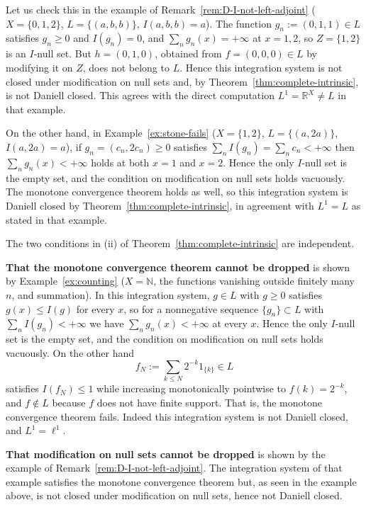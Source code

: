 \begin{example}
  Let us check this in the example of
  Remark~\ref{rem:D-I-not-left-adjoint} ($X=\{0,1,2\}$, $L=\{(a,b,b)\}$,
  $I(a,b,b)=a$).
  The function $g_n:=(0,1,1)\in L$ satisfies $g_n\ge0$ and $I(g_n)=0$, and
  $\sum_ng_n(x)=+\infty$ at $x=1,2$, so $Z=\{1,2\}$ is an $I$-null set.
  But $h=(0,1,0)$, obtained from $f=(0,0,0)\in L$ by modifying it on $Z$, does
  not belong to $L$.
  Hence this integration system is not closed under modification on null sets
  and, by Theorem~\ref{thm:complete-intrinsic}, is not Daniell closed.
  This agrees with the direct computation $L^1=\mathbb{R}^X\ne L$ in that
  example.

  On the other hand, in Example~\ref{ex:stone-fails} ($X=\{1,2\}$,
  $L=\{(a,2a)\}$, $I(a,2a)=a$), if $g_n=(c_n,2c_n)\ge0$ satisfies
  $\sum_nI(g_n)=\sum_nc_n<+\infty$ then $\sum_ng_n(x)<+\infty$ holds at both
  $x=1$ and $x=2$.
  Hence the only $I$-null set is the empty set, and the condition on
  modification on null sets holds vacuously.
  The monotone convergence theorem holds as well, so this integration system is
  Daniell closed by Theorem~\ref{thm:complete-intrinsic}, in agreement with
  $L^1=L$ as stated in that example.
\end{example}

\begin{remark}\label{rem:two-conditions-independent}
  The two conditions in (ii) of Theorem~\ref{thm:complete-intrinsic} are
  independent.

  \textbf{That the monotone convergence theorem cannot be dropped} is shown by
  Example~\ref{ex:counting} ($X=\mathbb{N}$, the functions vanishing outside
  finitely many $n$, and summation).
  In this integration system, $g\in L$ with $g\ge0$ satisfies $g(x)\le I(g)$ for
  every $x$, so for a nonnegative sequence $\{g_n\}\subset L$ with
  $\sum_nI(g_n)<+\infty$ we have $\sum_ng_n(x)<+\infty$ at every $x$.
  Hence the only $I$-null set is the empty set, and the condition on
  modification on null sets holds vacuously.
  On the other hand
  \[
    f_N:=\sum_{k\le N}2^{-k}1_{\{k\}}\in L
  \]
  satisfies $I(f_N)\le1$ while increasing monotonically pointwise to
  $f(k)=2^{-k}$, and $f\notin L$ because $f$ does not have finite support.
  That is, the monotone convergence theorem fails.
  Indeed this integration system is not Daniell closed, and $L^1=\ell^1$.

  \textbf{That modification on null sets cannot be dropped} is shown by the
  example of Remark~\ref{rem:D-I-not-left-adjoint}.
  The integration system of that example satisfies the monotone convergence
  theorem but, as seen in the example above, is not closed under modification on
  null sets, hence not Daniell closed.
\end{remark}

